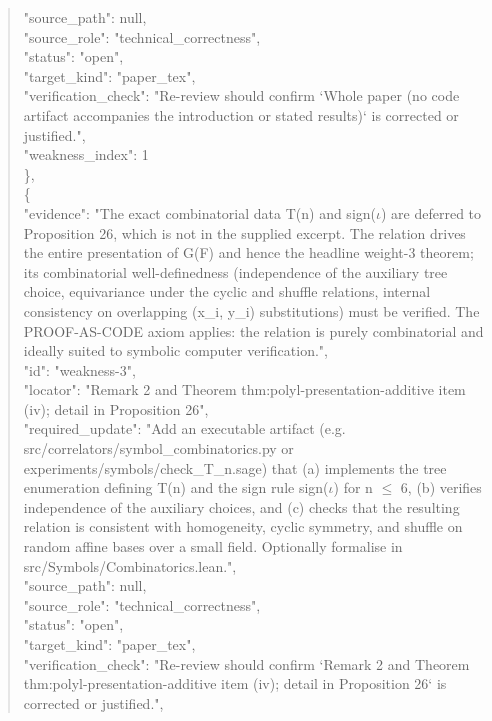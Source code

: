 \documentclass[11pt]{article}
\begin{document}
\begin{quote}
      "source\_path": null,\\
      "source\_role": "technical\_correctness",\\
      "status": "open",\\
      "target\_kind": "paper\_tex",\\
      "verification\_check": "Re-review should confirm `Whole paper (no code artifact accompanies the introduction or stated results)` is corrected or justified.",\\
      "weakness\_index": 1\\
    \},\\
    \{\\
      "evidence": "The exact combinatorial data T(n) and sign(\ensuremath{\iota}) are deferred to Proposition 26, which is not in the supplied excerpt. The relation drives the entire presentation of G(F) and hence the headline weight-3 theorem; its combinatorial well-definedness (independence of the auxiliary tree choice, equivariance under the cyclic and shuffle relations, internal consistency on overlapping (x\_i, y\_i) substitutions) must be verified. The PROOF-AS-CODE axiom applies: the relation is purely combinatorial and ideally suited to symbolic computer verification.",\\
      "id": "weakness-3",\\
      "locator": "Remark 2 and Theorem thm:polyl-presentation-additive item (iv); detail in Proposition 26",\\
      "required\_update": "Add an executable artifact (e.g. src/correlators/symbol\_combinatorics.py or experiments/symbols/check\_T\_n.sage) that (a) implements the tree enumeration defining T(n) and the sign rule sign(\ensuremath{\iota}) for n \ensuremath{\le} 6, (b) verifies independence of the auxiliary choices, and (c) checks that the resulting relation is consistent with homogeneity, cyclic symmetry, and shuffle on random affine bases over a small field. Optionally formalise in src/Symbols/Combinatorics.lean.",\\
      "source\_path": null,\\
      "source\_role": "technical\_correctness",\\
      "status": "open",\\
      "target\_kind": "paper\_tex",\\
      "verification\_check": "Re-review should confirm `Remark 2 and Theorem thm:polyl-presentation-additive item (iv); detail in Proposition 26` is corrected or justified.",\\

\end{quote}
\end{document}
